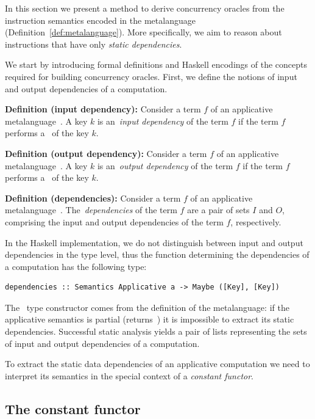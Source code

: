 In this section we present a method to derive concurrency oracles from the instruction
semantics encoded in the  metalanguage (Definition~\ref{def:metalanguage}).
More specifically, we aim to reason about instructions that
have only \emph{static dependencies}.

We start by introducing formal definitions and Haskell encodings of the concepts
required for building concurrency oracles.
First, we define the notions of input and output dependencies of a computation.

\textbf{Definition (input dependency):\label{def:in-dependencies}}
Consider a term $f$ of an applicative metalanguage~.
A key $k$ is an~\emph{input dependency} of the term $f$ if the term $f$
performs a~ of the key $k$.

\textbf{Definition (output dependency):\label{def:out-dependencies}}
Consider a term $f$ of an applicative metalanguage~.
A key $k$ is an~\emph{output dependency} of the term $f$ if the term $f$
performs a~ of the key $k$.

\textbf{Definition (dependencies):\label{def:dependencies}}
Consider a term $f$ of an applicative metalanguage~.
The~\emph{dependencies} of the term $f$ are a pair of sets $I$ and $O$,
comprising the input and output dependencies of the term $f$, respectively.

In the Haskell implementation, we do not distinguish between input and output dependencies
in the type level, thus the function determining the dependencies of a computation
has the following type:

\begin{verbatim}
dependencies :: Semantics Applicative a -> Maybe ([Key], [Key])
\end{verbatim}

\noindent
The~ type constructor comes from the definition of the metalanguage:
if the applicative semantics is partial (returns~) it is impossible
to extract its static dependencies. Successful static analysis yields a pair of
lists representing the sets of input and output dependencies of a computation.

To extract the static data dependencies of an applicative computation we need to
interpret its semantics in the special context of a \emph{constant functor}.

\subsection{The constant functor}

